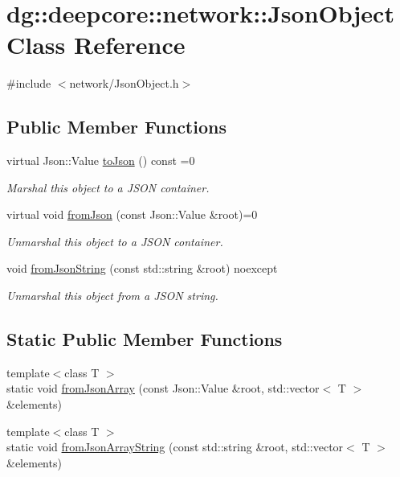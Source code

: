 \hypertarget{classdg_1_1deepcore_1_1network_1_1_json_object}{}\section{dg\+:\+:deepcore\+:\+:network\+:\+:Json\+Object Class Reference}
\label{classdg_1_1deepcore_1_1network_1_1_json_object}


{\ttfamily \#include $<$network/\+Json\+Object.\+h$>$}

\subsection*{Public Member Functions}
\begin{DoxyCompactItemize}
\item 
virtual Json\+::\+Value \hyperlink{group___network_module_ga96e3f7817a3257d80034811a9545f3ff}{to\+Json} () const =0
\begin{DoxyCompactList}\small\item\em Marshal this object to a J\+S\+ON container. \end{DoxyCompactList}\item 
virtual void \hyperlink{group___network_module_ga74a2303be2ae11e8d94101b55154362e}{from\+Json} (const Json\+::\+Value \&root)=0
\begin{DoxyCompactList}\small\item\em Unmarshal this object to a J\+S\+ON container. \end{DoxyCompactList}\item 
void \hyperlink{group___network_module_ga72539fce4a3396cb0e2adcb65fe911d8}{from\+Json\+String} (const std\+::string \&root) noexcept
\begin{DoxyCompactList}\small\item\em Unmarshal this object from a J\+S\+ON string. \end{DoxyCompactList}\end{DoxyCompactItemize}
\subsection*{Static Public Member Functions}
\begin{DoxyCompactItemize}
\item 
{\footnotesize template$<$class T $>$ }\\static void \hyperlink{classdg_1_1deepcore_1_1network_1_1_json_object_ae81f08e95123912253775b1729431ede}{from\+Json\+Array} (const Json\+::\+Value \&root, std\+::vector$<$ T $>$ \&elements)
\item 
{\footnotesize template$<$class T $>$ }\\static void \hyperlink{classdg_1_1deepcore_1_1network_1_1_json_object_adfd3a6da57cf68ad708f31890540ff6d}{from\+Json\+Array\+String} (const std\+::string \&root, std\+::vector$<$ T $>$ \&elements)
\end{DoxyCompactItemize}


